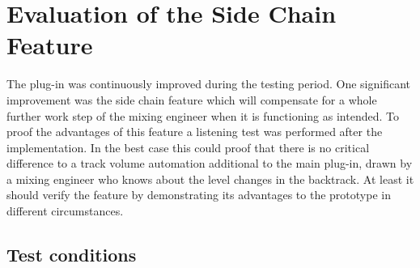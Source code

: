\chapter{Evaluation of the Side Chain Feature}
\label{chapter:evaluation}

The plug-in was continuously improved during the testing period. One significant improvement was the side chain feature which will compensate for a whole further work step of the mixing engineer when it is functioning as intended. To proof the advantages of this feature a listening test was performed after the implementation. In the best case this could proof that there is no critical difference to a track volume automation additional to the main plug-in, drawn by a mixing engineer who knows about the level changes in the backtrack. At least it should verify the feature by demonstrating its advantages to the prototype in different circumstances.\\

\section{Test conditions}

